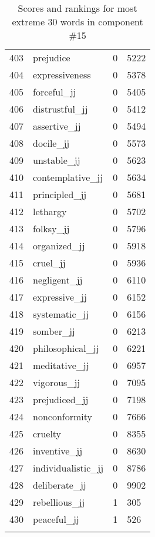 \begin{longtable}[!htbp]{| rlr@{.}l |}
    403 & prejudice & 0 & 5222 \\
    404 & expressiveness & 0 & 5378 \\
    405 & forceful\_jj & 0 & 5405 \\
    406 & distrustful\_jj & 0 & 5412 \\
    407 & assertive\_jj & 0 & 5494 \\
    408 & docile\_jj & 0 & 5573 \\
    409 & unstable\_jj & 0 & 5623 \\
    410 & contemplative\_jj & 0 & 5634 \\
    411 & principled\_jj & 0 & 5681 \\
    412 & lethargy & 0 & 5702 \\
    413 & folksy\_jj & 0 & 5796 \\
    414 & organized\_jj & 0 & 5918 \\
    415 & cruel\_jj & 0 & 5936 \\
    416 & negligent\_jj & 0 & 6110 \\
    417 & expressive\_jj & 0 & 6152 \\
    418 & systematic\_jj & 0 & 6156 \\
    419 & somber\_jj & 0 & 6213 \\
    420 & philosophical\_jj & 0 & 6221 \\
    421 & meditative\_jj & 0 & 6957 \\
    422 & vigorous\_jj & 0 & 7095 \\
    423 & prejudiced\_jj & 0 & 7198 \\
    424 & nonconformity & 0 & 7666 \\
    425 & cruelty & 0 & 8355 \\
    426 & inventive\_jj & 0 & 8630 \\
    427 & individualistic\_jj & 0 & 8786 \\
    428 & deliberate\_jj & 0 & 9902 \\
    429 & rebellious\_jj & 1 & 305 \\
    430 & peaceful\_jj & 1 & 526 \\
    \hline
    \caption{Scores and rankings for most extreme 30 words in component \#15} \\
\end{longtable}
